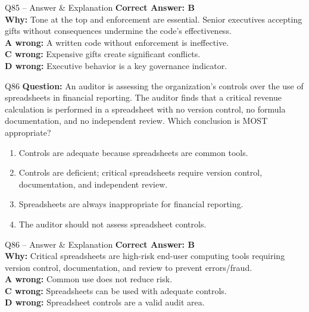 \documentclass[aspectratio=169,10pt]{beamer}
\begin{document}
	\begin{frame}[t]{Q85 -- Answer \& Explanation}
		\small
		\textbf{Correct Answer: B} \\[4pt]
		\textbf{Why:} Tone at the top and enforcement are essential. Senior executives accepting gifts without consequences undermine the code's effectiveness. \\[4pt]
		\textbf{A wrong:} A written code without enforcement is ineffective. \\[2pt]
		\textbf{C wrong:} Expensive gifts create significant conflicts. \\[2pt]
		\textbf{D wrong:} Executive behavior is a key governance indicator.
	\end{frame}
	
	\begin{frame}[t]{Q86}
		\small
		\textbf{Question:} An auditor is assessing the organization's controls over the use of spreadsheets in financial reporting. The auditor finds that a critical revenue calculation is performed in a spreadsheet with no version control, no formula documentation, and no independent review. Which conclusion is MOST appropriate?
		\begin{enumerate}[label=\Alph*.,itemsep=1pt,topsep=2pt]
			\item Controls are adequate because spreadsheets are common tools.
			\item Controls are deficient; critical spreadsheets require version control, documentation, and independent review.
			\item Spreadsheets are always inappropriate for financial reporting.
			\item The auditor should not assess spreadsheet controls.
		\end{enumerate}
	\end{frame}
	
	\begin{frame}[t]{Q86 -- Answer \& Explanation}
		\small
		\textbf{Correct Answer: B} \\[4pt]
		\textbf{Why:} Critical spreadsheets are high-risk end-user computing tools requiring version control, documentation, and review to prevent errors/fraud. \\[4pt]
		\textbf{A wrong:} Common use does not reduce risk. \\[2pt]
		\textbf{C wrong:} Spreadsheets can be used with adequate controls. \\[2pt]
		\textbf{D wrong:} Spreadsheet controls are a valid audit area.
	\end{frame}
	
\end{document}
